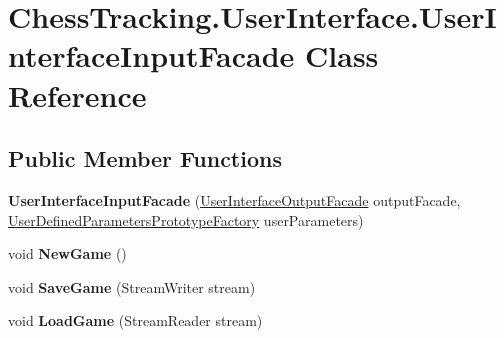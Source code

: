 \hypertarget{class_chess_tracking_1_1_user_interface_1_1_user_interface_input_facade}{}\section{Chess\+Tracking.\+User\+Interface.\+User\+Interface\+Input\+Facade Class Reference}
\label{class_chess_tracking_1_1_user_interface_1_1_user_interface_input_facade}
\subsection*{Public Member Functions}
\begin{DoxyCompactItemize}
\item 
\mbox{\label{class_chess_tracking_1_1_user_interface_1_1_user_interface_input_facade_a6162572f856dba8ff5d37bc3a0dc683c}} 
{\bfseries User\+Interface\+Input\+Facade} (\mbox{\hyperlink{class_chess_tracking_1_1_user_interface_1_1_user_interface_output_facade}{User\+Interface\+Output\+Facade}} output\+Facade, \mbox{\hyperlink{class_chess_tracking_1_1_image_processing_1_1_pipeline_data_1_1_user_defined_parameters_prototype_factory}{User\+Defined\+Parameters\+Prototype\+Factory}} user\+Parameters)
\item 
\mbox{\label{class_chess_tracking_1_1_user_interface_1_1_user_interface_input_facade_acde564517357cb980d3278d8ebed4b0d}} 
void {\bfseries New\+Game} ()
\item 
\mbox{\label{class_chess_tracking_1_1_user_interface_1_1_user_interface_input_facade_a7a2c50a48aa2b21204ca85878ad7b483}} 
void {\bfseries Save\+Game} (Stream\+Writer stream)
\item 
\mbox{\label{class_chess_tracking_1_1_user_interface_1_1_user_interface_input_facade_a5c62c7054f2b24deaaac8c4df1f7d28e}} 
void {\bfseries Load\+Game} (Stream\+Reader stream)
\item 
\mbox{\label{class_chess_tracking_1_1_user_interface_1_1_user_interface_input_facade_a94e2beb508d06eb9d03a814122e7922d}} 

\end{DoxyCompactItemize}
